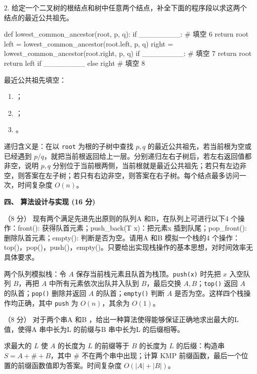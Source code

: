 \begin{question}
2. 给定一个二叉树的根结点和树中任意两个结点，补全下面的程序段以求这两个结点的最近公共祖先。
\begin{pycode}
def lowest_common_ancestor(root, p, q):
    if ________:                         # 填空 6
        return root
    left = lowest_common_ancestor(root.left, p, q)
    right = lowest_common_ancestor(root.right, p, q)
    if ________:                         # 填空 7
        return root
    return left if ________ else right   # 填空 8
\end{pycode}
\begin{solution}
最近公共祖先填空：
  \begin{enumerate}[leftmargin=2em]
    \item \texttt{}；
    \item \texttt{}；
    \item \texttt{}。
  \end{enumerate}
递归含义是：在以 \texttt{root} 为根的子树中查找 $p,q$ 的最近公共祖先，若当前根为空或已经遇到 $p/q$，就把当前根返回给上一层。分别递归左右子树后，若左右返回值都非空，说明 $p,q$ 分别位于当前根两侧，当前根就是最近公共祖先；若只有左边非空，则答案在左子树；若只有右边非空，则答案在右子树。每个结点最多访问一次，时间复杂度 $O(n)$。
\end{solution}
\end{question}

\textbf{四、 算法设计与实现 (16 分)}
\begin{question}
（8 分） 现有两个满足先进先出原则的队列A 和B，在队列上可进行以下4 个操作：front(): 获得队首元素；push\_back(T x)：把元素x 插到队尾；pop\_front(): 删除队首元素；empty(): 判断是否为空。请用A 和B 模拟一个栈的4 个操作：top()，pop()，push()，empty()。只要给出实现栈操作的基本思想，对时间效率无具体要求。
\begin{solution}
两个队列模拟栈：令 $A$ 保存当前栈元素且队首为栈顶。\texttt{push(x)} 时先把 $x$ 入空队列 $B$，再把 $A$ 中所有元素依次出队并入队到 $B$，最后交换 $A,B$；\texttt{top()} 返回 $A$ 的队首；\texttt{pop()} 删除并返回 $A$ 的队首；\texttt{empty()} 判断 $A$ 是否为空。这样四个栈操作均正确，其中 \texttt{push} 为 $O(n)$，其余为 $O(1)$。
\end{solution}
\end{question}

\begin{question}
（8 分） 对于两个串A 和B ，给出一种算法使得能够保证正确地求出最大的L 值，使得A 串中长为L 的前缀与B 串中长为L 的后缀相等。
\begin{solution}
求最大的 $L$ 使 $A$ 的长度为 $L$ 的前缀等于 $B$ 的长度为 $L$ 的后缀：构造串 $S=A+\# +B$，其中 $\#$ 不在两个串中出现；计算 KMP 前缀函数，最后一个位置的前缀函数值即为答案。时间复杂度 $O(|A|+|B|)$。
\end{solution}
\end{question}


